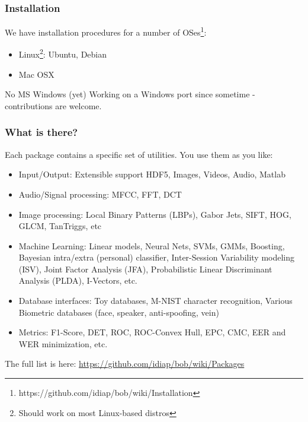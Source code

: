 \begin{frame}
  \frametitle{Installation}

  We have installation procedures for a number of
  OSes\footnote{https://github.com/idiap/bob/wiki/Installation}:

  \vspace{2em}

  \begin{itemize}
    \item Linux\footnote{Should work on most Linux-based distros}: Ubuntu,
      Debian
    \item Mac OSX
  \end{itemize}

  \vspace{2em}

  \begin{block}{No MS Windows (yet)}
    Working on a Windows port since sometime - contributions are welcome.
  \end{block}

\end{frame}


\begin{frame}
  \frametitle{What is there?}

  Each package contains a specific set of utilities. You use them as you like:

  \vspace{0.5em}

  \begin{itemize}
    \item Input/Output: Extensible support HDF5, Images, Videos, Audio, Matlab
    \item Audio/Signal processing: MFCC, FFT, DCT
    \item Image processing: Local Binary Patterns (LBPs), Gabor Jets, SIFT,
      HOG, GLCM, TanTriggs, etc
    \item Machine Learning: Linear models, Neural Nets, SVMs, GMMs, Boosting,
      Bayesian intra/extra (personal) classifier, Inter-Session Variability
      modeling (ISV), Joint Factor Analysis (JFA), Probabilistic Linear
      Discriminant Analysis (PLDA), I-Vectors, etc.
    \item Database interfaces: Toy databases, M-NIST character recognition,
      Various Biometric databases (face, speaker, anti-spoofing, vein)
    \item Metrics: F1-Score, DET, ROC, ROC-Convex Hull, EPC, CMC, EER and WER
    minimization, etc.
  \end{itemize}

  \vspace{1em}

  The full list is here: \url{https://github.com/idiap/bob/wiki/Packages}

\end{frame}


